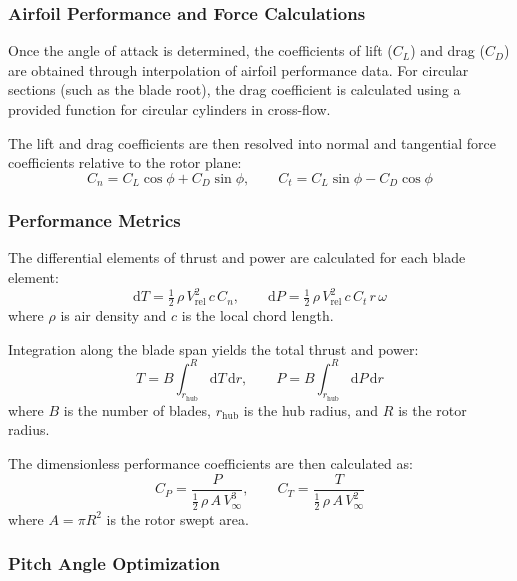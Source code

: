 \documentclass[11pt]{article}
\begin{document}
\subsubsection{Airfoil Performance and Force Calculations}

Once the angle of attack is determined, the coefficients of lift ($C_L$) and drag ($C_D$) are obtained through interpolation of airfoil performance data. For circular sections (such as the blade root), the drag coefficient is calculated using a provided function for circular cylinders in cross-flow.

The lift and drag coefficients are then resolved into normal and tangential force coefficients relative to the rotor plane:
\begin{equation}
 C_n = C_L\cos\phi + C_D\sin\phi, \qquad C_t = C_L\sin\phi - C_D\cos\phi
\label{eq:cn_ct}
\end{equation}

\subsubsection{Performance Metrics}

The differential elements of thrust and power are calculated for each blade element:
\begin{equation}
\mathrm{d}T = \tfrac{1}{2}\,\rho\,V_{\mathrm{rel}}^{2}\, c\, C_n, \qquad \mathrm{d}P = \tfrac{1}{2}\,\rho\,V_{\mathrm{rel}}^{2}\, c\, C_t\, r\,\omega
\label{eq:dT_dP}
\end{equation}
where $\rho$ is air density and $c$ is the local chord length.

Integration along the blade span yields the total thrust and power:
\begin{equation}
 T = B \int_{r_\text{hub}}^{R} \! \mathrm{d}T\,\mathrm{d}r, \qquad P = B \int_{r_\text{hub}}^{R} \! \mathrm{d}P\,\mathrm{d}r
\label{eq:integrals}
\end{equation}
where $B$ is the number of blades, $r_\text{hub}$ is the hub radius, and $R$ is the rotor radius.

The dimensionless performance coefficients are then calculated as:
\begin{equation}
 C_P = \frac{P}{\tfrac{1}{2}\,\rho\,A\,V_\infty^{3}}, \qquad C_T = \frac{T}{\tfrac{1}{2}\,\rho\,A\,V_\infty^{2}}
\label{eq:cp_ct}
\end{equation}
where $A = \pi R^{2}$ is the rotor swept area.

\subsubsection{Pitch Angle Optimization}
\end{document}
